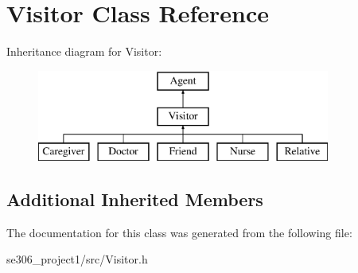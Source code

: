 \hypertarget{classVisitor}{\section{Visitor Class Reference}
\label{classVisitor}
}
Inheritance diagram for Visitor\-:\begin{figure}[H]
\begin{center}
\leavevmode
\includegraphics[height=3.000000cm]{classVisitor}
\end{center}
\end{figure}
\subsection*{Additional Inherited Members}


The documentation for this class was generated from the following file\-:\begin{DoxyCompactItemize}
\item 
se306\-\_\-project1/src/Visitor.\-h\end{DoxyCompactItemize}

